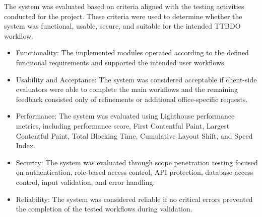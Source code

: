 The system was evaluated based on criteria aligned with the testing activities conducted for the project. These criteria were used to determine whether the system was functional, usable, secure, and suitable for the intended TTBDO workflow.

\begin{itemize}
  \item Functionality: The implemented modules operated according to the defined functional requirements and supported the intended user workflows.
  \item Usability and Acceptance: The system was considered acceptable if client-side evaluators were able to complete the main workflows and the remaining feedback consisted only of refinements or additional office-specific requests.
  \item Performance: The system was evaluated using Lighthouse performance metrics, including performance score, First Contentful Paint, Largest Contentful Paint, Total Blocking Time, Cumulative Layout Shift, and Speed Index.
  \item Security: The system was evaluated through scope penetration testing focused on authentication, role-based access control, API protection, database access control, input validation, and error handling.
  \item Reliability: The system was considered reliable if no critical errors prevented the completion of the tested workflows during validation.
\end{itemize}
